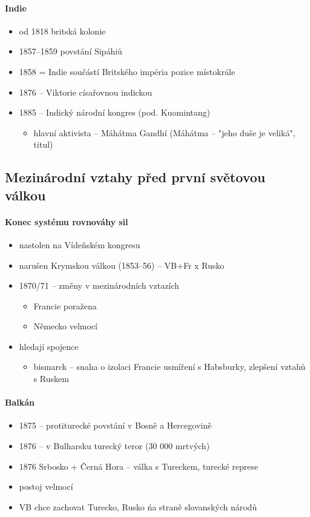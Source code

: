 \paragraph{Indie}
\begin{itemize}
\item od 1818 britská kolonie
\item 1857--1859 povstání Sipáhiů
\item 1858 = Indie součástí Britského impéria \ra pozice místokrále
\item 1876 -- Viktorie císařovnou indickou
\item 1885 -- Indický národní kongres (pod. Kuomintang)
	\begin{itemize}
	\item hlavní aktivista -- Máhátma Gandhí (Máhátma -- "jeho duše je veliká", titul)
	\end{itemize}
\end{itemize}

\subsection{Mezinárodní vztahy před první světovou válkou}
\paragraph{Konec systému rovnováhy sil}
\begin{itemize}
\item nastolen na Vídeňském kongresu
\item narušen Krymskou válkou (1853--56) -- VB+Fr x Rusko
\item 1870/71 -- změny v mezinárodních vztazích
	\begin{itemize}
	\item Francie poražena 
	\item Německo velmocí
	\end{itemize}
\item hledají spojence
	\begin{itemize}
	\item bismarck -- snaha o izolaci Francie \ra usmíření s Habsburky, zlepšení vztahů s Ruskem
	\end{itemize}
\end{itemize}

\paragraph{Balkán}
\begin{itemize}
\item 1875 -- protiturecké povstání v Bosně a Hercegovině
\item 1876 -- v Bulharsku \ra turecký teror (30 000 mrtvých)
\item 1876 Srbosko + Černá Hora -- válka s Tureckem, turecké represe
\item postoj velmocí
\item VB chce zachovat Turecko, Rusko ńa straně slovanských národů
\end{itemize}

